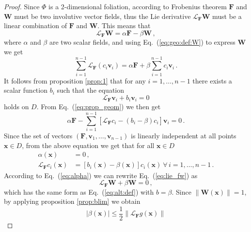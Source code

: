 \documentclass{article}
\theoremstyle{plain}
\theoremstyle{definition}
\theoremstyle{remark}
\newcommand{\vect}[1]{\boldsymbol{#1}}
\begin{document}
\begin{proof}
Since $\Phi$ is a 2-dimensional foliation, 
according to Frobenius theorem $\vect{F}$ and $\vect{W}$ must be
  two involutive vector fields, thus the Lie derivative
  $\mathcal{L}_{\vect{F}}\vect{W}$ must be a linear combination of
  $\vect{F}$ and $\vect{W}$. This means that
  \begin{equation}\label{eq:lie_fw}
    \mathcal{L}_{\vect{F}}\vect{W} = \alpha \vect{F} - \beta \vect{W}\,,
  \end{equation}
  where $\alpha$ and $\beta$ are two scalar fields, and
using Eq.~(\ref{eq:geo:def:W}) to express $\vect{W}$ we get
  \begin{equation}\label{eq:prop_geom}
    \sum_{i=1}^{n-1} \mathcal{L}_{\vect{F}}(c_i \vect{v}_i) =
    \alpha \vect{F} + \beta \sum_{i=1}^{n-1} c_i \vect{v}_i\,.
  \end{equation}
It follows from proposition \ref{prop:1} that for any $i=1, \dots, n-1$
there exists a scalar function $b_i$ such that the equation
 \begin{equation}
    \mathcal{L}_{\vect{F}} \vect{v}_i + b_i \vect v_i = 0 
    \label{eq:alt:defi}
  \end{equation}  
holds on $D$. From Eq.~(\ref{eq:prop_geom}) we then get
  \begin{equation}\label{eq:foliation_c}
\alpha \vect{F} -\sum_{i=1}^{n-1}\left[\mathcal{L}_{\vect{F}}c_i-
(b_i-\beta)c_i \right] \vect{v}_i = 0    \,.
  \end{equation}
Since the set of vectors $\left(\vect{F},\vect{v}_1, \dots, 
\vect{v}_{n-1}\right)$ is
linearly independent at all points $\vect{x}\in D$, 
from the above equation we get that for all $\vect{x} \in D$
\begin{align}
\alpha(\vect{x})&=0 \,, \label{eq:alpha}\\
 \mathcal{L}_{\vect{F}}c_i(\vect{x})&=\left[b_i(\vect{x})-
\beta(\vect{x})\right]c_i(\vect{x})\ \forall\,i=1,\dots, n-1\,. \label{eq:coeffci}
\end{align}
According to Eq.~(\ref{eq:alpha}) we can rewrite Eq.~(\ref{eq:lie_fw}) as
 \begin{equation}\label{eq:lie_fw1}
    \mathcal{L}_{\vect{F}}\vect{W} +\beta \vect{W}=0\,,
  \end{equation}
which has the same form as Eq.~(\ref{eq:alt:def}) with $b=\beta$.
Since $\lVert \vect{W}(\vect{x})\rVert =1$, by applying proposition 
\ref{prop:blim} we obtain
\begin{equation}%
\lvert \beta(\vect{x})\rvert \leq \frac 12 \lVert 
\mathcal{L}_{\vect{F}} g(\vect{x}) \rVert

\end{equation}
\end{proof}
\end{document}
